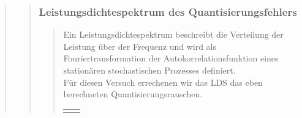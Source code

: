 \begin{quote}
\begin{quote}
\begin{quote}
        \end{quote}  %
        
        \subsubsection{Leistungsdichtespektrum des Quantisierungsfehlers}
		\begin{quote}
		
		Ein Leistungsdichtespektrum beschreibt die Verteilung der Leistung über der Frequenz und wird als
		Fouriertransformation der Autokorrelationsfunktion eines stationären stochastischen Prozesses definiert.\cite{LDS}\\
		Für diesen Versuch errechenen wir das LDS das eben berechneten Quantisierungsrauschen. 

        \begin{center}
            \begin{tabular}{ll}
            
            \hspace{-4cm}
                

\end{tabular}
\end{center}
\end{quote}
\end{quote}
\end{quote}
